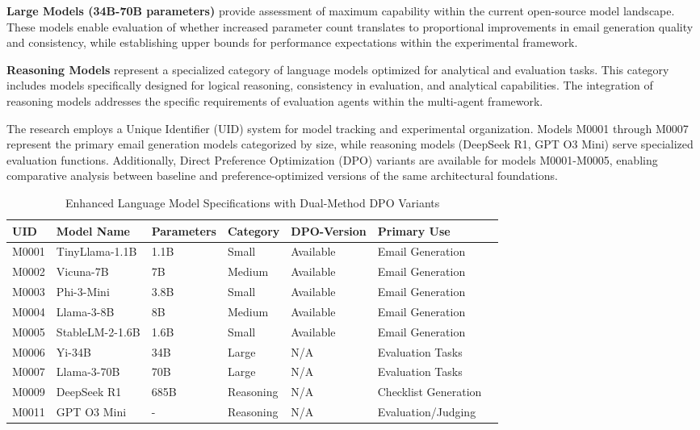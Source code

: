 \textbf{Large Models (34B-70B parameters)} provide assessment of maximum capability within the current open-source model landscape. These models enable evaluation of whether increased parameter count translates to proportional improvements in email generation quality and consistency, while establishing upper bounds for performance expectations within the experimental framework.

\textbf{Reasoning Models} represent a specialized category of language models optimized for analytical and evaluation tasks. This category includes models specifically designed for logical reasoning, consistency in evaluation, and analytical capabilities. The integration of reasoning models addresses the specific requirements of evaluation agents within the multi-agent framework.

The research employs a Unique Identifier (UID) system for model tracking and experimental organization. Models M0001 through M0007 represent the primary email generation models categorized by size, while reasoning models (DeepSeek R1, GPT O3 Mini) serve specialized evaluation functions. Additionally, Direct Preference Optimization (DPO) variants are available for models M0001-M0005, enabling comparative analysis between baseline and preference-optimized versions of the same architectural foundations.

\begin{table}[H]
    \centering
    \caption{Enhanced Language Model Specifications with Dual-Method DPO Variants}
    \label{tab:model-specifications}
    \begin{tabular}{|l|l|l|l|l|l|l|}
    \hline
    \textbf{UID} & \textbf{Model Name} & \textbf{Parameters} & \textbf{Category} & \textbf{DPO-Version} & \textbf{Primary Use} \\
    \hline
    M0001 & TinyLlama-1.1B & 1.1B & Small & Available & Email Generation \\
    M0002 & Vicuna-7B & 7B & Medium & Available & Email Generation \\
    M0003 & Phi-3-Mini & 3.8B & Small & Available & Email Generation \\
    M0004 & Llama-3-8B & 8B & Medium & Available & Email Generation \\
    M0005 & StableLM-2-1.6B & 1.6B & Small & Available & Email Generation \\
    M0006 & Yi-34B & 34B & Large & N/A & Evaluation Tasks \\
    M0007 & Llama-3-70B & 70B & Large & N/A & Evaluation Tasks \\
    M0009 & DeepSeek R1 & 685B & Reasoning & N/A & Checklist Generation \\
    M0011 & GPT O3 Mini & - & Reasoning & N/A & Evaluation/Judging \\
    \hline
    \end{tabular}
\end{table}


